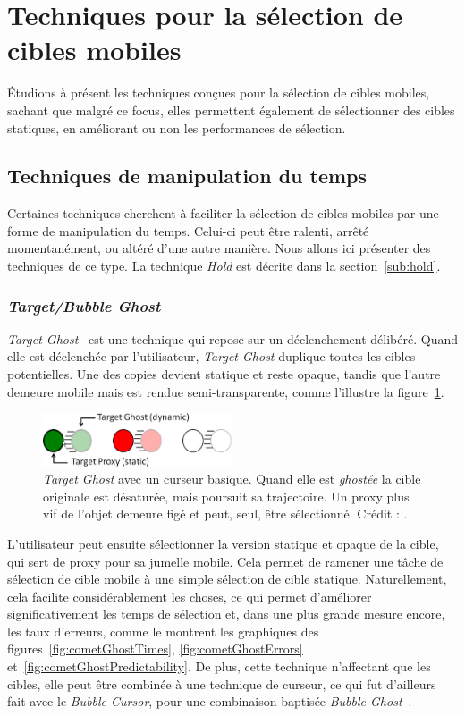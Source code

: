 \section{Techniques pour la sélection de cibles mobiles}
	Étudions à présent les techniques conçues pour la sélection de cibles mobiles, sachant que malgré ce focus, elles permettent également de sélectionner des cibles statiques, en améliorant ou non les performances de sélection.
	
	\subsection{Techniques de manipulation du temps}
	\label{sub:timeLord}
	Certaines techniques cherchent à faciliter la sélection de cibles mobiles par une forme de manipulation du temps. Celui-ci peut être ralenti, arrêté momentanément, ou altéré d'une autre manière. Nous allons ici présenter des techniques de ce type.	La technique \emph{Hold} est décrite dans la section~\ref{sub:hold}.
	
	\subsubsection{\emph{Target/Bubble Ghost}}
	\emph{Target Ghost}~\cite{hasan2011comet} est une technique qui repose sur un déclenchement délibéré. Quand elle est déclenchée par l'utilisateur, \emph{Target Ghost} duplique toutes les cibles potentielles. Une des copies devient statique et reste opaque, tandis que l'autre demeure mobile mais est rendue semi-transparente, comme l'illustre la figure~\ref{fig:targetGhost}.
	
	\begin{figure}[htbp]
		\centering
		\includegraphics[width=0.5\textwidth]{figures/ch2/targetGhost}
		\caption[La technique \emph{Target Ghost}]{\emph{Target Ghost} avec un curseur basique. Quand elle est \og \emph{ghostée} \fg{} la cible originale est désaturée, mais poursuit sa trajectoire. Un proxy plus vif de l'objet demeure figé et peut, seul, être sélectionné. Crédit : \cite{hasan2011comet}.}
		\label{fig:targetGhost}
	\end{figure}
	
	L'utilisateur peut ensuite sélectionner la version statique et opaque de la cible, qui sert de proxy pour sa jumelle mobile. Cela permet de ramener une tâche de sélection de cible mobile à une simple sélection de cible statique. Naturellement, cela facilite considérablement les choses, ce qui permet d'améliorer significativement les temps de sélection et, dans une plus grande mesure encore, les taux d'erreurs, comme le montrent les graphiques des figures~\ref{fig:cometGhostTimes}, \ref{fig:cometGhostErrors} et~\ref{fig:cometGhostPredictability}. De plus, cette technique n'affectant que les cibles, elle peut être combinée à une technique de curseur, ce qui fut d'ailleurs fait avec le \emph{Bubble Cursor}, pour une combinaison baptisée \emph{Bubble Ghost}~\cite{hasan2011comet}.

